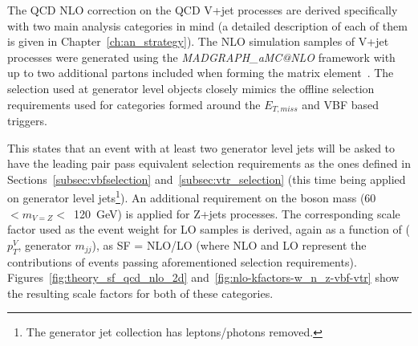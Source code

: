 \hspace{10pt} The QCD NLO correction on the QCD V+jet processes are derived specifically with two main analysis categories in mind (a detailed description of each of them is given in Chapter~\ref{ch:an_strategy}). The NLO simulation samples of V+jet processes were generated using the \emph{MADGRAPH\_aMC@NLO} framework with up to two additional partons included when forming the matrix element~\cite{note:AN_19_257}. The selection used at generator level objects closely mimics the offline selection requirements used for categories formed around the $E_{T,miss}$ and VBF based triggers.

\hspace{10pt} This states that an event with at least two generator level jets will be asked to have the leading pair pass equivalent selection requirements as the ones defined in Sections~\ref{subsec:vbfselection} and~\ref{subsec:vtr_selection} (this time being applied on generator level jets\footnote{The generator jet collection has leptons/photons removed.}). An additional requirement on the boson mass (60~$<m_{V=Z}<$~120~GeV) is applied for Z+jets processes. The corresponding scale factor used as the event weight for LO samples is derived, again as a function of ($p_T^{V}$, generator $m_{jj}$), as SF = NLO/LO (where NLO and LO represent the contributions of events passing aforementioned selection requirements). Figures~\ref{fig:theory_sf_qcd_nlo_2d} and~\ref{fig:nlo-kfactors-w_n_z-vbf-vtr} show the resulting scale factors for both of these categories.

